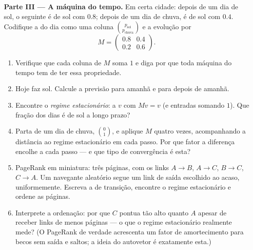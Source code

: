 \begin{problem}
\medskip
\noindent\textbf{Parte III --- A máquina do tempo.}
Em certa cidade: depois de um dia de sol, o seguinte é de sol
com  $0.8$; depois de um dia de chuva, é de sol com
 $0.4$. Codifique a  do dia como uma
coluna $\binom{p_{\text{sol}}}{p_{\text{chuva}}}$ e a evolução
por
\[
M = \begin{pmatrix} 0.8 & 0.4\\ 0.2 & 0.6 \end{pmatrix}.
\]
\begin{enumerate}[resume]
  \item Verifique que cada coluna de $M$ soma $1$ e diga por que
        toda máquina do tempo tem de ter essa propriedade.
  \item Hoje faz sol. Calcule a previsão para amanhã e para
        depois de amanhã.
  \item Encontre o \emph{regime estacionário}: a 
        $v$ com $Mv = v$ (e entradas somando $1$). Que fração
        dos dias é de sol a longo prazo?
  \item Parta de um dia de chuva, $\binom01$, e aplique $M$
        quatro vezes, acompanhando a distância ao regime
        estacionário em cada passo. Por que fator a diferença
        encolhe a cada passo --- e que tipo de convergência é
        esta?
  \item PageRank em miniatura: três páginas, com os links
        $A \to B$, $A \to C$, $B \to C$, $C \to A$. Um
        navegante aleatório segue um link de saída escolhido ao
        acaso, uniformemente. Escreva a  de transição,
        encontre o regime estacionário e ordene as páginas.
  \item Interprete a ordenação: por que $C$ pontua tão alto
        quanto $A$ apesar de receber links de menos páginas ---
        o que o regime estacionário realmente mede? (O PageRank
        de verdade acrescenta um fator de amortecimento para
        becos sem saída e saltos; a ideia do autovetor é
        exatamente esta.)
\end{enumerate}


\end{problem}
